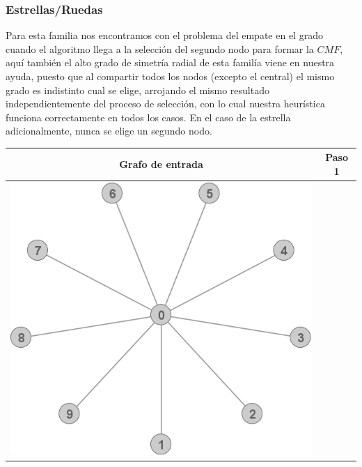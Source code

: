 \subsubsection{Estrellas/Ruedas}
\label{subsub:ruedas}
	Para esta familia nos encontramos con el problema del empate en el grado cuando 
	el algoritmo llega a la selecci\'on del segundo nodo para formar la $CMF$, aqu\'i
	tambi\'en el alto grado de simetr\'ia radial de esta famil\'ia viene en nuestra 
	ayuda, puesto que al compartir todos los nodos (excepto el central) el mismo grado
	es indistinto cual se elige, arrojando el mismo resultado independientemente del 
	proceso de selecci\'on, con lo cual nuestra heur\'istica funciona correctamente
	en todos los casos. En el caso de la estrella adicionalmente, nunca se elige un 
	segundo nodo.

	\begin{center}
		\begin{tabular}{ |c||c| }
			\hline
			Grafo de entrada & Paso 1 \\
			\hline\hline
			\includegraphics[scale = 0.25]{img/ej3/constructiva_golosa/Star_st0.png} &

\end{tabular}
\end{center}
